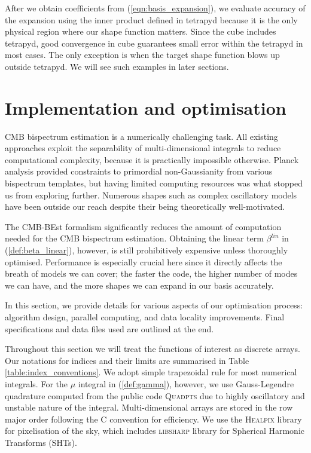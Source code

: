 After we obtain coefficients from (\ref{eqn:basis_expansion}), we evaluate accuracy of the expansion using the inner product defined in tetrapyd because it is the only physical region where our shape function matters. Since the cube includes tetrapyd, good convergence in cube guarantees small error within the tetrapyd in most cases. The only exception is when the target shape function blows up outside tetrapyd. We will see such examples in later sections.


\section{Implementation and optimisation} \label{section:implementation}

CMB bispectrum estimation is a numerically challenging task. All existing approaches exploit the separability of multi-dimensional integrals to reduce computational complexity, because it is practically impossible otherwise. Planck analysis provided constraints to primordial non-Gaussianity from various bispectrum templates, but having limited computing resources was what stopped us from exploring further. Numerous shapes such as complex oscillatory models have been outside our reach despite their being theoretically well-motivated.

The CMB-BEst formalism significantly reduces the amount of computation needed for the CMB bispectrum estimation. Obtaining the linear term $\beta^{lin}$ in (\ref{def:beta_linear}), however, is still prohibitively expensive unless thoroughly optimised. Performance is especially crucial here since it directly affects the breath of models we can cover; the faster the code, the higher number of modes we can have, and the more shapes we can expand in our basis accurately.

In this section, we provide details for various aspects of our optimisation process: algorithm design, parallel computing, and data locality improvements. Final specifications and data files used are outlined at the end.

Throughout this section we will treat the functions of interest as discrete arrays. Our notations for indices and their limits are summarised in Table \ref{table:index_conventions}. We adopt simple trapezoidal rule for most numerical integrals. For the $\mu$ integral in (\ref{def:gamma}), however, we use Gauss-Legendre quadrature computed from the public code \textsc{Quadpts} \cite{Hale2013} due to highly oscillatory and unstable nature of the integral. Multi-dimensional arrays are stored in the row major order following the \textsc{C} convention for efficiency. We use the \textsc{Healpix} library \cite{Gorski2005healpix} for pixelisation of the sky, which includes \textsc{libsharp} \cite{Reinecke2013libsharp} library for Spherical Harmonic Transforms (SHTs).

